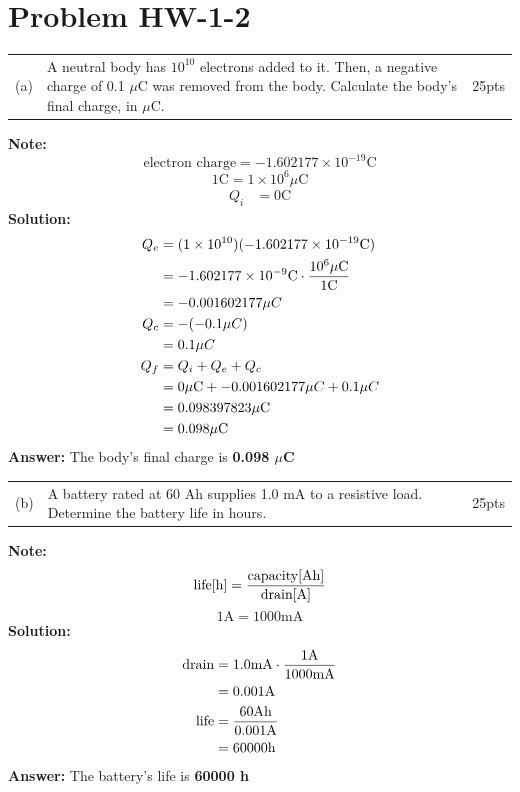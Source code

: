 \documentclass{article}
\newcommand{\problemstatement}[3]{
\noindent
\begin{tabular}{ m{0.5cm} m{42em} m{0.5cm} }
	({#1}) & {#2} & {#3}pts
\end{tabular}
}
\begin{document}
\section{Problem HW-1-2}
\problemstatement{a}{A neutral body has $10^{10}$ electrons added to it. Then, a negative charge of 0.1 $\mu$C was removed from the body. Calculate the body’s final charge, in $\mu$C.}{25}
\begin{addmargin}[1.5cm]{0em}
	\noindent
	\textbf{Note:} \\
	\begin{equation}
	\text{electron charge} = -1.602177 \times 10^{-19} \text{C}
	\end{equation}
	\begin{equation}
	1 \text{C} = 1 \times 10^6 \mu \text{C} 
	\end{equation}
	\begin{align*}
		Q_i &= 0 \text{C}
	\end{align*}
	\noindent
	\textbf{Solution:} \\
	\begin{align*}
		Q_e &= (1 \times 10^{10})(-1.602177 \times 10^{-19} \text{C}) \\
		&= -1.602177 \times 10^{-9} \text{C} \cdot { 10^6 \mu \text{C} \over 1 \text{C} } \\
		&= -0.001602177 \mu C \\
		Q_c &= -(-0.1 \mu C) \\
		&= 0.1 \mu C \\
		Q_f &= Q_i + Q_e + Q_c \\
		&= 0 \mu \text{C} + -0.001602177 \mu C + 0.1 \mu C \\
		&= 0.098397823 \mu \text{C} \\
		&= 0.098 \mu \text{C}
	\end{align*}
	\noindent
	\textbf{Answer:} The body's final charge is \textbf{0.098 $\mu$C}
\end{addmargin}

\newpage
\problemstatement{b}{A battery rated at 60 Ah supplies 1.0 mA to a resistive load. Determine the battery life in hours.}{25}
\begin{addmargin}[1.5cm]{0em}
	\noindent
	\textbf{Note:} \\
	\begin{equation}
	\text{life[h]} = {\text{capacity[Ah]} \over \text{drain[A]}}
	\end{equation}
	\begin{equation}
	1 \text{A} = 1000 \text{mA}
	\end{equation}
	\noindent
	\textbf{Solution:} \\
	\begin{align*}
		\text{drain} &= 1.0 \text{mA} \cdot { 1 \text{A} \over 1000 \text{mA} } \\
		&= 0.001 \text{A} \\
		\text{life} &= {60 \text{Ah} \over 0.001 \text{A} } \\
		&= 60000 \text{h}
	\end{align*}
	\noindent
	\textbf{Answer:} The battery's life is \textbf{60000 h} \\
\end{addmargin}
\end{document}
